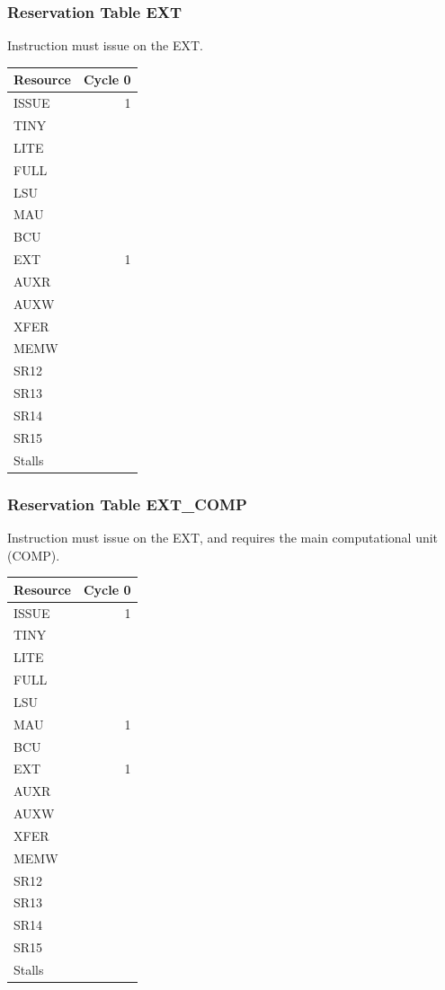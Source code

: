 \subsubsection{Reservation Table EXT} \label{sec:reservation-EXT}

Instruction must issue on the EXT.
\medskip

\begin{tabular}{|l|r|} \hline
Resource	& Cycle 0 \\ \hline
\textsf{ISSUE}	& 1	\\
\textsf{TINY}	& 	\\
\textsf{LITE}	& 	\\
\textsf{FULL}	& 	\\
\textsf{LSU}	& 	\\
\textsf{MAU}	& 	\\
\textsf{BCU}	& 	\\
\textsf{EXT}	& 1	\\
\textsf{AUXR}	& 	\\
\textsf{AUXW}	& 	\\
\textsf{XFER}	& 	\\
\textsf{MEMW}	& 	\\
\textsf{SR12}	& 	\\
\textsf{SR13}	& 	\\
\textsf{SR14}	& 	\\
\textsf{SR15}	& 	\\
\hline Stalls	& 	\\
\hline \end{tabular}

\subsubsection{Reservation Table EXT\_COMP} \label{sec:reservation-EXT-COMP}

Instruction must issue on the EXT, and requires the main computational unit (COMP).
\medskip

\begin{tabular}{|l|r|} \hline
Resource	& Cycle 0 \\ \hline
\textsf{ISSUE}	& 1	\\
\textsf{TINY}	& 	\\
\textsf{LITE}	& 	\\
\textsf{FULL}	& 	\\
\textsf{LSU}	& 	\\
\textsf{MAU}	& 1	\\
\textsf{BCU}	& 	\\
\textsf{EXT}	& 1	\\
\textsf{AUXR}	& 	\\
\textsf{AUXW}	& 	\\
\textsf{XFER}	& 	\\
\textsf{MEMW}	& 	\\
\textsf{SR12}	& 	\\
\textsf{SR13}	& 	\\
\textsf{SR14}	& 	\\
\textsf{SR15}	& 	\\
\hline Stalls	& 	\\
\hline \end{tabular}

